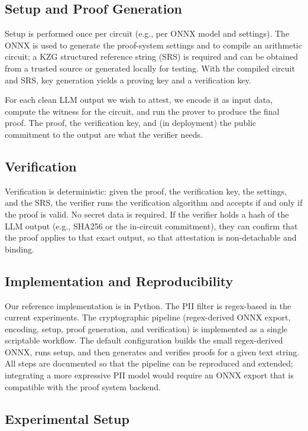 \documentclass[10pt,conference,a4paper]{IEEEtran}
\begin{document}
\subsection{Setup and Proof Generation}

Setup is performed once per circuit (e.g., per ONNX model and settings). The ONNX is used to generate the proof-system settings and to compile an arithmetic circuit; a KZG structured reference string (SRS) is required and can be obtained from a trusted source or generated locally for testing. With the compiled circuit and SRS, key generation yields a proving key and a verification key.

For each clean LLM output we wish to attest, we encode it as input data, compute the witness for the circuit, and run the prover to produce the final proof. The proof, the verification key, and (in deployment) the public commitment to the output are what the verifier needs.

\subsection{Verification}

Verification is deterministic: given the proof, the verification key, the settings, and the SRS, the verifier runs the verification algorithm and accepts if and only if the proof is valid. No secret data is required. If the verifier holds a hash of the LLM output (e.g., SHA256 or the in-circuit commitment), they can confirm that the proof applies to that exact output, so that attestation is non-detachable and binding.

\subsection{Implementation and Reproducibility}

Our reference implementation is in Python. The PII filter is regex-based in the current experiments. The cryptographic pipeline (regex-derived ONNX export, encoding, setup, proof generation, and verification) is implemented as a single scriptable workflow. The default configuration builds the small regex-derived ONNX, runs setup, and then generates and verifies proofs for a given text string. All steps are documented so that the pipeline can be reproduced and extended; integrating a more expressive PII model would require an ONNX export that is compatible with the proof system backend.

\subsection{Experimental Setup}
\end{document}
